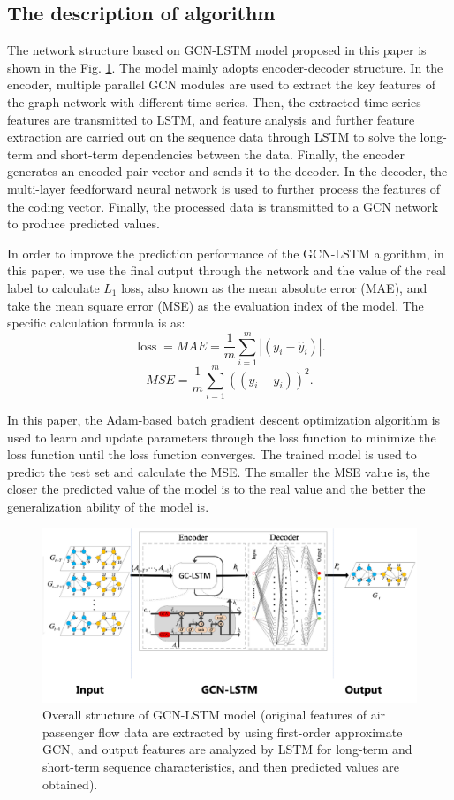 \documentclass[journal,article,submit,moreauthors,pdftex]{Definitions/mdpi}
\begin{document}
\subsection{The description of algorithm}
The network structure based on GCN-LSTM model proposed in this paper is shown in the Fig. \ref{fig:GCN-LSTM}. The model mainly adopts encoder-decoder structure. In the encoder, multiple parallel GCN modules are used to extract the key features of the graph network with different time series. Then, the extracted time series features are transmitted to LSTM, and feature analysis and further feature extraction are carried out on the sequence data through LSTM to solve the long-term and short-term dependencies between the data. Finally, the encoder generates an encoded pair vector and sends it to the decoder. In the decoder, the multi-layer feedforward neural network is used to further process the features of the coding vector. Finally, the processed data is transmitted to a GCN network to produce predicted values.
\par  In order to improve the prediction performance of the GCN-LSTM algorithm, in this paper, we use the final output through the network and the value of the real label to calculate $L_{1}$ loss, also known as the mean absolute error (MAE), and take the mean square error (MSE) as the evaluation index of the model. The specific calculation formula is as:
\begin{equation}
    \operatorname{loss}=M A E=\frac{1}{m} \sum_{i=1}^{m}\left|\left(y_{i}-\hat{y}_{i}\right)\right|.
\end{equation}
\begin{equation}
    M S E=\frac{1}{m} \sum_{i=1}^{m}\left(\left(y_{i}-\hat{y}_{i}\right)\right)^{2}.
\end{equation}
\par In this paper, the Adam-based batch gradient descent optimization algorithm is used to learn and update parameters through the loss function to minimize the loss function until the loss function converges. The trained model is used to predict the test set and calculate the MSE. The smaller the MSE value is, the closer the predicted value of the model is to the real value and the better the generalization ability of the model is.
\begin{figure}[htbp]
    \centering
    \includegraphics[width=12 cm]{./imgs/GCN-LSTM.png}
    \caption{Overall structure of GCN-LSTM model (original features of air passenger flow data are extracted by using first-order approximate GCN, and output features are analyzed by LSTM for long-term and short-term sequence characteristics, and then predicted values are obtained).}
    \label{fig:GCN-LSTM}
\end{figure}
\end{document}
